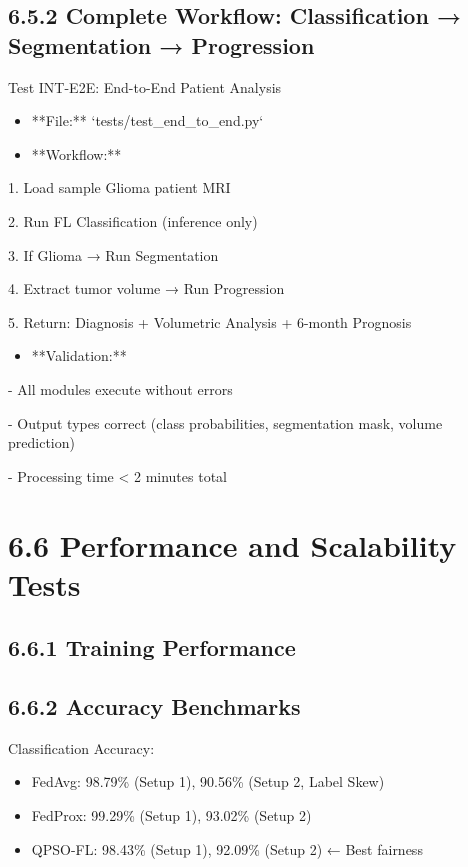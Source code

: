 \subsection{6.5.2 Complete Workflow: Classification → Segmentation → Progression}
Test INT-E2E: End-to-End Patient Analysis

\begin{itemize}
  \item **File:** `tests/test\_end\_to\_end.py`
  \item **Workflow:**
\end{itemize}

1. Load sample Glioma patient MRI

2. Run FL Classification (inference only)

3. If Glioma → Run Segmentation

4. Extract tumor volume → Run Progression

5. Return: Diagnosis + Volumetric Analysis + 6-month Prognosis

\begin{itemize}
  \item **Validation:**
\end{itemize}

- All modules execute without errors

- Output types correct (class probabilities, segmentation mask, volume prediction)

- Processing time < 2 minutes total


\section{6.6 Performance and Scalability Tests}

\subsection{6.6.1 Training Performance}

\subsection{6.6.2 Accuracy Benchmarks}
Classification Accuracy:

\begin{itemize}
  \item FedAvg: 98.79\% (Setup 1), 90.56\% (Setup 2, Label Skew)
  \item FedProx: 99.29\% (Setup 1), 93.02\% (Setup 2)
  \item QPSO-FL: 98.43\% (Setup 1), 92.09\% (Setup 2) ← Best fairness
\end{itemize}

